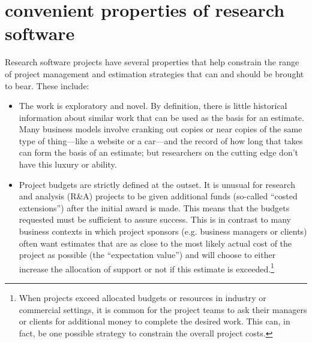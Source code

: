 \documentclass[12pt,oneside]{book}
\begin{document}
\newpage
{}
\section*{convenient properties of research software}

Research software projects have several properties that help constrain the range of project management and estimation strategies that can and should be brought to bear. These include:\
\begin{itemize}[wide, labelwidth=!, labelindent=0pt, font=\bfseries]
\item The work is exploratory and novel. By definition, there is little historical information about similar work that can be used as the basis for an estimate. Many business models involve cranking out copies or near copies of the same type of thing---like a website or a car---and the record of how long that takes can form the basis of an estimate; but researchers on the cutting edge don't have this luxury or ability.
\item Project budgets are strictly defined at the outset. It is unusual for research and analysis (R\&A) projects to be given additional funds (so-called ``costed extensions'') after the initial award is made. This means that the budgets requested must be sufficient to assure success. This is in contrast to many business contexts in which project sponsors (e.g. business managers or clients) often want estimates that are as close to the most likely actual cost of the project as possible (the ``expectation value'') and will choose to either increase the allocation of support or not if this estimate is exceeded.\footnote{When projects exceed allocated budgets or resources in industry or commercial settings, it is common for the project teams to ask their managers or clients for additional money to complete the desired work. This can, in fact, be one possible strategy to constrain the overall project costs.}

\end{itemize}
\end{document}
